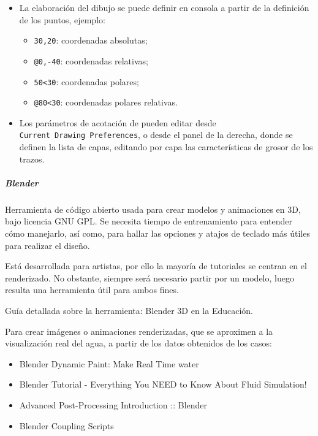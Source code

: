 \begin{itemize}
\item
  La elaboración del dibujo se puede definir en consola a partir de la
  definición de los puntos, ejemplo:

  \begin{itemize}
  \item
    \texttt{30,20}: coordenadas absolutas;
    \item
      \texttt{@0,-40}: coordenadas relativas;
    \item
      \texttt{50\textless{}30}: coordenadas polares;
    \item
      \texttt{@80\textless{}30}: coordenadas polares relativas.
   \end{itemize}

 \item
  Los parámetros de acotación de pueden editar desde
  \texttt{Current\ Drawing\ Preferences}, o desde el panel de la
  derecha, donde se definen la lista de capas, editando por capa las
  características de grosor de los trazos.
 \end{itemize}

\subparagraph{Blender\cite{Blender}}\label{header-n137}

Herramienta de código abierto usada para crear modelos y animaciones en
3D, bajo licencia GNU GPL. Se necesita tiempo de entrenamiento para
entender cómo manejarlo, así como, para hallar las opciones y atajos de
teclado más útiles para realizar el diseño.

Está desarrollada para artistas, por ello la mayoría de tutoriales se
centran en el renderizado. No obstante, siempre será necesario partir
por un modelo, luego resulta una herramienta útil para ambos fines.

Guía detallada sobre la herramienta: Blender 3D en la Educación\cite{Blender3DEd}.

Para crear imágenes o animaciones renderizadas, que se aproximen a la
visualización real del agua, a partir de los datos obtenidos de los casos:

\begin{itemize}
\item
  Blender Dynamic Paint: Make Real Time water\cite{youtubeBlenderWater}
\item
  Blender Tutorial - Everything You NEED to Know About Fluid Simulation!\cite{youtubeBlenderTutorial}
\item
  Advanced Post-Processing Introduction :: Blender\cite{youtubeBlenderTraining}
\item
  Blender Coupling Scripts\cite{BlenderCouplingScripts}
\end{itemize}


